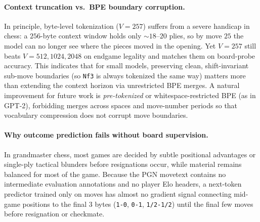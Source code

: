 \documentclass[11pt]{article}
\begin{document}
\paragraph{Context truncation vs.\ BPE boundary corruption.} In principle, byte-level tokenization ($V=257$) suffers from a severe handicap in chess: a $256$-byte context window holds only $\sim 18$--$20$ plies, so by move $25$ the model can no longer see where the pieces moved in the opening. Yet $V=257$ still beats $V=512, 1024, 2048$ on endgame legality and matches them on board-probe accuracy. This indicates that for small models, preserving clean, shift-invariant sub-move boundaries (so \texttt{Nf3} is always tokenized the same way) matters more than extending the context horizon via unrestricted BPE merges. A natural improvement for future work is \emph{pre-tokenized} or whitespace-restricted BPE (as in GPT-2), forbidding merges across spaces and move-number periods so that vocabulary compression does not corrupt move boundaries.

\paragraph{Why outcome prediction fails without board supervision.} In grandmaster chess, most games are decided by subtle positional advantages or single-ply tactical blunders before resignations occur, while material remains balanced for most of the game. Because the PGN movetext contains no intermediate evaluation annotations and no player Elo headers, a next-token predictor trained only on moves has almost no gradient signal connecting mid-game positions to the final $3$ bytes (\texttt{1-0}, \texttt{0-1}, \texttt{1/2-1/2}) until the final few moves before resignation or checkmate.



\end{document}
